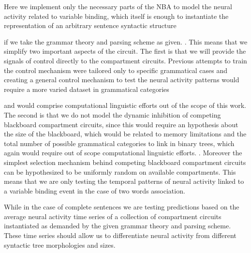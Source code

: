 \documentclass[10pt]{article}
\newcommand{\noteCP}[1]{}
\begin{document}
Here we implement only the necessary parts of the NBA to model the neural activity related to variable binding, which itself is enough to instantiate the representation of an arbitrary sentence syntactic structure
\noteCP{What you mean here, is it is enough to have a CONS-like operation --- in LISP parlance --- to build any tree, right?}
if we take the grammar theory and parsing scheme as given.
\noteCP{Think about the reader who does not know the distinction between grammar theory and parsing The previous paragraph, with more details, could explain it.
Or get reif of it.
This may actually not be an important distinction for the purpose of this paper}.
This means that we simplify two important aspects of the circuit.
The first is that we will provide the signals of control directly to the compartment circuits.
Previous attempts to train the control mechanism\cite{van_der_Velde_2010} were tailored only to specific grammatical cases and creating a general control mechanism to test the neural activity patterns would require a more varied dataset in grammatical categories
\noteCP{???}
and would comprise computational linguistic efforts out of the scope of this work.
The second is that we do not model the dynamic inhibition of competing blackboard compartment circuits, since this would require an hypothesis about the size of the blackboard, which would be related to memory limitations and the total number of possible grammatical categories to link in binary trees, which again would require out of scope computational linguistic efforts.
\noteCP{More of a psycholinguitics issue than a computational linguistics one, no?}.
Moreover the simplest selection mechanism behind competing blackboard compartment circuits can be hypothesized to be uniformly random on available compartments.
This means that we are only testing the temporal patterns of neural activity linked to a variable binding event in the case of two words association.
\noteCP{But but but, you are also modeling the binding of a word and a phrase, no?}
While in the case of complete sentences we are testing predictions based on the average neural activity time series of a collection of compartment circuits instantiated as demanded by the given grammar theory and parsing scheme.
These time series should allow us to differentiate neural activity from different syntactic tree morphologies and sizes.





\end{document}
